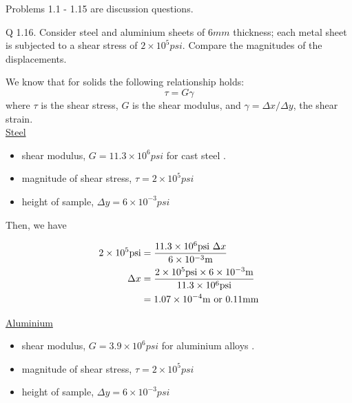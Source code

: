 Problems 1.1 - 1.15 are discussion questions.

\begin{question}
  Q 1.16. Consider steel and aluminium sheets of $6\si{mm}$ thickness; each metal sheet is subjected to a shear stress of $2 \times 10^{5} \si{psi}$. Compare the magnitudes of the displacements.
\end{question}

\begin{solution}
  We know that for solids the following relationship holds:
  \begin{equation}\label{eq:shear-solids}
    \tau = G \gamma
  \end{equation}
  where $\tau$ is the shear stress, $G$ is the shear modulus, and $\gamma = \Delta x / \Delta y$, the shear strain.
  \\

  \noindent \underline{Steel}
  \begin{itemize}
    \item shear modulus, $G = 11.3 \times 10^6 \si{psi}$ for cast steel \parencite{engineering03shearmodulus}.
    \item magnitude of shear stress, $\tau = 2 \times 10^5 \si{psi}$
    \item height of sample, $ \Delta y = 6 \times 10^{-3} \si{psi}$
  \end{itemize}

  Then, we have

  \begin{align*}
    2 \times 10^5 \si{psi} &= \frac{ 11.3 \times 10^6 \si{psi} ~ \Delta x }{ 6 \times 10^{-3} \si{m} } \\
    \Delta x &= \frac{ 2 \times 10^{5} \si{psi} \times 6 \x 10^{-3} \si{m} }{ 11.3 \times 10^{6} \si{psi} } \\
    &= 1.07 \x 10^{-4} \si{m} \text{ or } 0.11 \si{mm}
  \end{align*}

  \noindent \underline{Aluminium}
  \begin{itemize}
    \item shear modulus, $G = 3.9 \times 10^6 \si{psi}$ for aluminium alloys \parencite{engineering03shearmodulus}.
    \item magnitude of shear stress, $\tau = 2 \times 10^5 \si{psi}$
    \item height of sample, $ \Delta y = 6 \times 10^{-3} \si{psi}$
  \end{itemize}


\end{solution}
